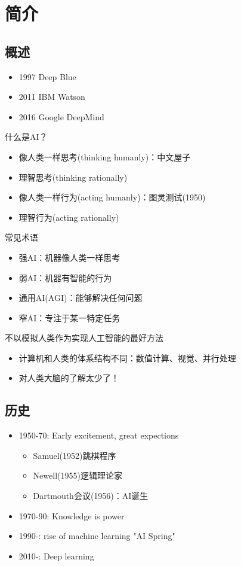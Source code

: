 
\section{简介}
\subsection{概述}
\begin{itemize}
\item 1997 Deep Blue
\item 2011 IBM Watson
\item 2016 Google DeepMind
\end{itemize}

什么是AI？
\begin{itemize}
	\item 像人类一样思考(thinking humanly)：中文屋子
	\item 理智思考(thinking rationally)
	\item 像人类一样行为(acting humanly)：图灵测试(1950)
	\item 理智行为(acting rationally)
\end{itemize}

常见术语
\begin{itemize}
	\item 强AI：机器像人类一样思考
	\item 弱AI：机器有智能的行为
	\item 通用AI(AGI)：能够解决任何问题
	\item 窄AI：专注于某一特定任务
\end{itemize}

不以模拟人类作为实现人工智能的最好方法
\begin{itemize}
	\item 计算机和人类的体系结构不同：数值计算、视觉、并行处理
	\item 对人类大脑的了解太少了！
\end{itemize}

\subsection{历史}
\begin{itemize}
\item 1950-70: Early excitement, great expections
\begin{itemize}
	\item Samuel(1952)跳棋程序
	\item Newell(1955)逻辑理论家
	\item Dartmouth会议(1956)：AI诞生
\end{itemize}
\item 1970-90: Knowledge is power
\item 1990-: rise of machine learning "AI Spring"
\item 2010-: Deep learning
\end{itemize}